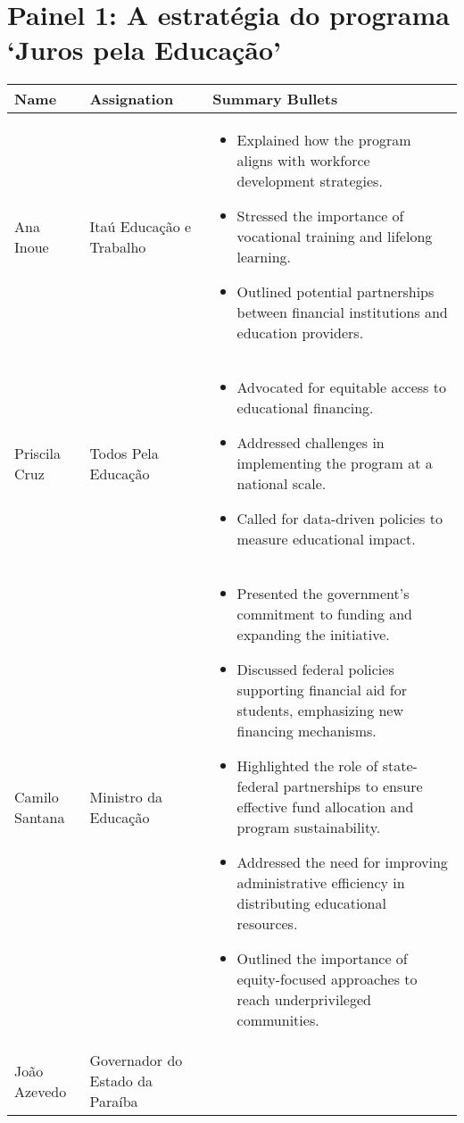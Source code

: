 \documentclass[a4paper,10pt]{article}
\begin{document}
\section*{Painel 1: A estratégia do programa `Juros pela Educação'}

\begin{table}[htbp!]
\centering
\renewcommand{\arraystretch}{1.2}
\begin{tabular}{|p{1in}|p{1.4in}|p{4in}|}
\hline
Name & Assignation & Summary Bullets \\
\hline
Ana Inoue & Itaú Educação e Trabalho & \begin{itemize}
\item Explained how the program aligns with workforce development strategies.
\item Stressed the importance of vocational training and lifelong learning.
\item Outlined potential partnerships between financial institutions and education providers.
\end{itemize}\\
\hline
Priscila Cruz & Todos Pela Educação & \begin{itemize}
\item Advocated for equitable access to educational financing.
\item Addressed challenges in implementing the program at a national scale.
\item Called for data-driven policies to measure educational impact.
\end{itemize}\\
\hline
Camilo Santana & Ministro da Educação & \begin{itemize}
\item Presented the government’s commitment to funding and expanding the initiative.
\item Discussed federal policies supporting financial aid for students, emphasizing new financing mechanisms.
\item Highlighted the role of state-federal partnerships to ensure effective fund allocation and program sustainability.
\item Addressed the need for improving administrative efficiency in distributing educational resources.
\item Outlined the importance of equity-focused approaches to reach underprivileged communities.
\end{itemize}\\
\hline
João Azevedo & Governador do Estado da Paraíba & \begin{itemize}

\end{itemize}
\end{tabular}
\end{table}
\end{document}
